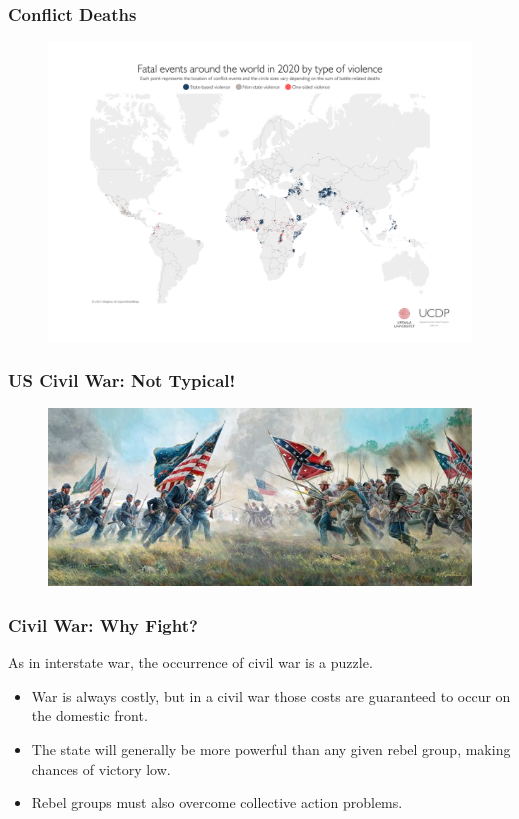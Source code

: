 \documentclass{beamer}
\begin{document}
\begin{frame} 
	\frametitle{\LARGE{Conflict Deaths}}
	\begin{figure}[ht!]
		\centering
		\includegraphics[width=\textwidth,height=\textheight,keepaspectratio]{worldin2020.png}
	\end{figure}
\end{frame}

\begin{frame} 
	\frametitle{\LARGE{US Civil War: Not Typical!}}
	\begin{figure}[ht!]
		\centering
		\includegraphics[width=\textwidth,height=\textheight,keepaspectratio]{uscivwar.jpeg}
	\end{figure}
\end{frame}

\begin{frame} 
\frametitle{\LARGE{Civil War: Why Fight?}}
As in interstate war, the occurrence of civil war is a puzzle. \pause
\begin{itemize}
		\item War is always costly, but in a civil war those costs are guaranteed to occur on the domestic front. \pause
		\item The state will generally be more powerful than any given rebel group, making chances of victory low. \pause
		\item Rebel groups must also overcome collective action problems.
\end{itemize}
\end{frame}
\end{document}
